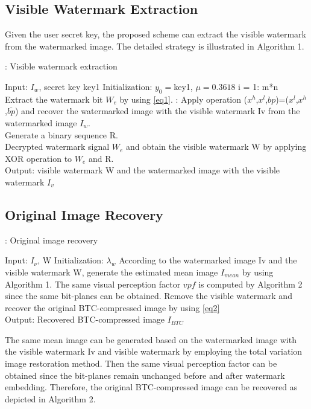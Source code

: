 \documentclass[12pt,a4paper]{article}
\begin{document}
\subsection{Visible Watermark Extraction}
Given the user secret key, the proposed scheme can extract the visible watermark from the watermarked image. The detailed strategy is illustrated in Algorithm 1.



\begin{algorithm}
\caption{: Visible watermark extraction}\label{algo1}
\begin{algorithmic}
\State Input: $I_w$, secret key key1
\State Initialization: $y_0=$key1, $\mu=0.3618$
\For i = 1: m*n
\State Extract the watermark bit $W_e$ by using \ref{eq1}.
:
\State Apply operation ($x^h$,$x^l$,$bp$)=($x^l$,$x^h$,$\overline{bp}$) and recover the watermarked image with the visible watermark Iv from the watermarked image $I_w$.
\EndIf
\EndFor\\
Generate a binary sequence R.\\
Decrypted watermark signal $W_e$ and obtain the visible watermark W by applying XOR operation to $W_e$ and R.\\
Output: visible watermark W and the watermarked image with the visible watermark $I_v$

\end{algorithmic}
\end{algorithm}

\subsection{Original Image Recovery}
\begin{algorithm}
\caption{: Original image recovery}\label{algo2}
\begin{algorithmic}
\State Input: $I_\nu$, W
\State Initialization: $\lambda_w$
\State According to the watermarked image Iv and the visible watermark W, generate the estimated mean image $I_{mean}$ by using Algorithm 1.
\State The same visual perception factor $vpf$ is computed by Algorithm 2 since the same bit-planes can be obtained.
    \State Remove the visible watermark and recover the original BTC-compressed image by using \ref{eq2}
\EndFor\\
Output: Recovered BTC-compressed image $I_{BTC}$
\end{algorithmic}
\end{algorithm}

The same mean image can be generated based on the watermarked image with the visible watermark Iv and visible watermark by employing the total variation image restoration method. Then the same visual perception factor can be obtained since the bit-planes remain unchanged before and after watermark embedding. Therefore, the original BTC-compressed image can be recovered as depicted in Algorithm 2.
\end{document}
